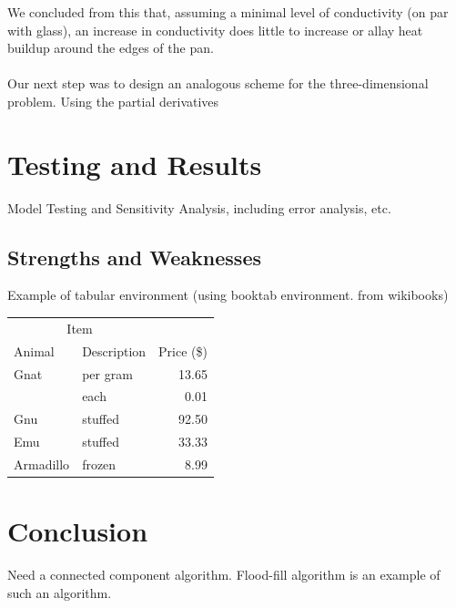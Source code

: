 \documentclass[12pt]{reedmcm}
\begin{document}
We concluded from this that, assuming a minimal level of conductivity (on par with glass), an increase in conductivity does little to increase or allay heat buildup around the edges of the pan.\\
\\
Our next step was to design an analogous scheme for the three-dimensional problem.  Using the partial derivatives 

\section{Testing and Results}
Model Testing and Sensitivity Analysis, including error analysis, etc.
\subsection{Strengths and Weaknesses}

Example of tabular environment (using booktab environment. from wikibooks) 

\begin{tabular}{llr}
\toprule
\multicolumn{2}{c}{Item} \\
\cmidrule(r){1-2}
Animal    & Description & Price (\$) \\
\midrule
Gnat      & per gram    & 13.65      \\
          & each        & 0.01       \\
Gnu       & stuffed     & 92.50      \\
Emu       & stuffed     & 33.33      \\
Armadillo & frozen      & 8.99       \\
\bottomrule
\end{tabular}

\section{Conclusion}
Need a connected component algorithm.
Flood-fill algorithm is an example of such an algorithm.

\renewcommand{\bibname}{References}

\nocite{*}

\end{document}
